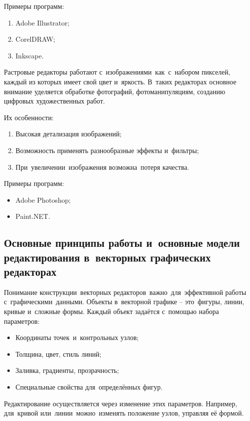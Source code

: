 \documentclass{ou}
\begin{document}
Примеры программ:
\begin{enumerate}[itemindent=2em, nosep, label=\arabic*)]
  \item Adobe Illustrator;
  \item CorelDRAW;
  \item Inkscape.
\end{enumerate}

Растровые редакторы работают с~изображениями~как~с~набором пикселей, каждый из которых имеет свой цвет и~яркость. В~таких редакторах основное внимание уделяется обработке фотографий, фотоманипуляциям, созданию цифровых художественных работ.

Их особенности:
\begin{enumerate}[itemindent=2em, nosep, label=\arabic*)]
  \item Высокая детализация изображений;
  \item Возможность применять разнообразные эффекты и~фильтры;
  \item При~увеличении~изображения возможна~потеря качества.
\end{enumerate}

Примеры программ: 
\begin{itemize}[label=-, itemindent=2em, nosep]
  \item Adobe Photoshop;
  \item Paint.NET.
\end{itemize}
\subsection{Основные принципы работы и~основные модели редактирования в~векторных графических редакторах}
Понимание конструкции~векторных редакторов~важно~для~эффективной работы с~графическими~данными. Объекты в~векторной графике -- это~фигуры, линии, кривые и~сложные формы. Каждый объект задаётся с~помощью набора параметров:
\begin{itemize}[label=-, itemindent=2em, nosep]
  \item Координаты точек~и~контрольных узлов;
  \item Толщина, цвет, стиль линий;
  \item Заливка, градиенты, прозрачность;
  \item Специальные свойства для~определённых фигур.
\end{itemize}

Редактирование осуществляется через изменение этих параметров. Например, для~кривой или~линии~можно~изменять положение узлов, управляя её формой.
\end{document}

